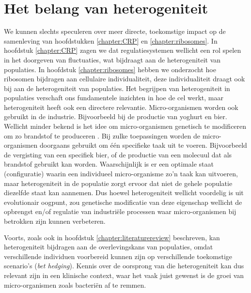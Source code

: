 \section*{Het belang van heterogeniteit}

We kunnen slechts speculeren over meer directe, toekomstige impact op de samenleving 
van hoofdstukken \ref{chapter:CRP} en \ref{chapter:ribosomes}.
%
In hoofdstuk \ref{chapter:CRP} zagen we dat regulatiesystemen wellicht een rol spelen in het doorgeven van fluctuaties,
wat bijdraagt aan de heterogeniteit van populaties.
%
In hoofdstuk \ref{chapter:ribosomes} hebben we onderzocht hoe ribosomen bijdragen aan cellulaire individualiteit, 
deze individualiteit draagt ook bij aan de heterogeniteit van populaties.
%
Het begrijpen van heterogeniteit in populaties verschaft ons fundamentele inzichten in hoe de cel werkt, 
maar heterogeniteit heeft ook een directere relevantie.
%
Micro-organismen worden ook gebruikt in de industrie.
%
Bijvoorbeeld bij de productie van yoghurt en bier.
%
Wellicht minder bekend is het idee om micro-organismen 
genetisch te modificeren om zo brandstof te produceren \cite{Lee2008, Savakis2013}. 
%
Bij zulke toepassingen worden de micro-organismen doorgaans gebruikt om één specifieke taak uit te voeren.
%
Bijvoorbeeld de vergisting van een specifiek bier, of de productie van een molecuul dat als brandstof gebruikt kan worden.
%
Waarschijnlijk is er een optimale staat (configuratie) waarin een individueel micro-organisme zo'n taak kan uitvoeren,
maar heterogeniteit in de populatie zorgt ervoor dat niet de gehele populatie diezelfde staat kan aannemen. 
%
Dus hoewel heterogeniteit wellicht voordelig is uit evolutionair oogpunt, 
zou genetische modificatie van deze eigenschap wellicht de opbrengst en/of regulatie van industriële processen waar micro-organismen bij betrokken zijn 
kunnen verbeteren.


Voorts, zoals ook in hoofdstuk \ref{chapter:literaturereview} beschreven, 
kan heterogeniteit bijdragen aan de overlevingskans van populaties, 
omdat verschillende individuen voorbereid kunnen zijn op verschillende toekomstige scenario's (\textit{bet hedging}).
%
Kennis over de oorsprong van die heterogeniteit kan dus relevant zijn in een klinische context, 
waar het vaak juist gewenst is de groei van micro-organismen zoals bacteriën af te remmen. 













